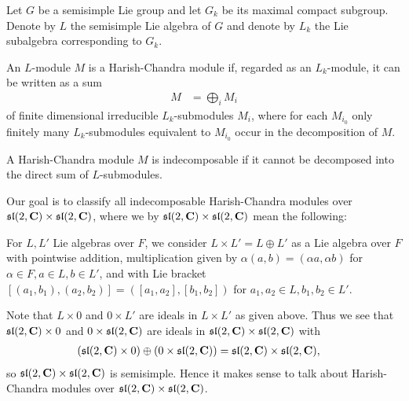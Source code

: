 Let $G$ be a semisimple Lie group and let $G_k$ be its maximal compact subgroup. Denote by $L$ the semisimple Lie algebra of $G$ and denote by $L_k$ the Lie subalgebra corresponding to $G_k$.

\begin{definition}\label{def:HarishChandra}
  An $L$-module $M$ is a Harish-Chandra module if, regarded as an $L_k$-module, it can be written as a sum
  \begin{align*}
    M &= \bigoplus_{i} M_i
  \end{align*}
  of finite dimensional irreducible $L_k$-submodules $M_i$, where for each $M_{i_0}$ only finitely many $L_k$-submodules equivalent to $M_{i_0}$ occur in the decomposition of $M$.

  A Harish-Chandra module $M$ is indecomposable if it cannot be decomposed into the direct sum of $L$-submodules.
\end{definition}

Our goal is to classify all indecomposable Harish-Chandra modules over $\mathfrak{sl}(2,\mathbf{C})\times \mathfrak{sl}(2,\mathbf{C})$, where we by $\mathfrak{sl}(2,\mathbf{C})\times \mathfrak{sl}(2,\mathbf{C})$ mean the following:

For $L,L'$ Lie algebras over $F$, we consider $L\times L'=L\oplus L'$ as a Lie algebra over $F$ with pointwise addition, multiplication given by $\alpha(a,b)=(\alpha a,\alpha b)$ for $\alpha\in F,a\in L,b\in L'$, and with Lie bracket $[(a_1,b_1),(a_2,b_2)]=([a_1,a_2],[b_1,b_2])$ for $a_1,a_2\in L,b_1,b_2\in L'$.

\begin{remark}
  Note that $L\times 0$ and $0\times L'$ are ideals in $L\times L'$ as given above. Thus we see that $\mathfrak{sl}(2,\mathbf{C})\times 0$ and $0\times \mathfrak{sl}(2,\mathbf{C})$ are ideals in $\mathfrak{sl}(2,\mathbf{C})\times \mathfrak{sl}(2,\mathbf{C})$ with
  \begin{align*}
    (\mathfrak{sl}(2,\mathbf{C})\times 0) \oplus (0\times\mathfrak{sl}(2,\mathbf{C})) &= \mathfrak{sl}(2,\mathbf{C})\times \mathfrak{sl}(2,\mathbf{C}),
  \end{align*}
  so $\mathfrak{sl}(2,\mathbf{C})\times \mathfrak{sl}(2,\mathbf{C})$ is semisimple. Hence it makes sense to talk about Harish-Chandra modules over $\mathfrak{sl}(2,\mathbf{C})\times \mathfrak{sl}(2,\mathbf{C})$.
\end{remark}

